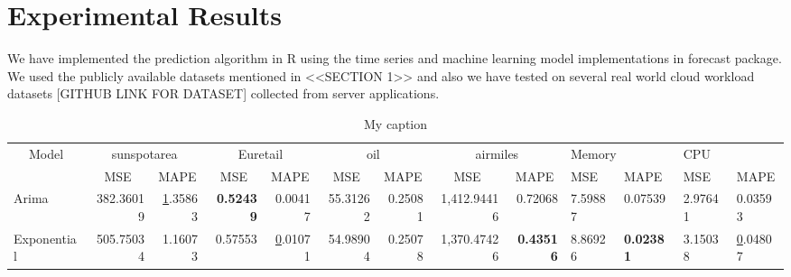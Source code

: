 \usepackage{booktabs}
\usepackage{multirow}
\usepackage[normalem]{ulem}
\useunder{\uline}{\ul}{}

\section{Experimental Results}

We have implemented the prediction algorithm in R using the time series and machine learning model implementations in forecast package. We used the publicly available datasets mentioned in <<SECTION 1>> and also we have tested on several real world cloud workload datasets [GITHUB LINK FOR DATASET] collected from server applications.

\begin{table}[]
\centering
\caption{My caption}
\label{my-label}
\begin{tabular}{@{}|l|r|r|r|r|r|r|r|r|l|l|l|l|@{}}
\toprule
\multicolumn{1}{|c|}{\multirow{2}{*}{Model}} & \multicolumn{2}{c|}{sunspotarea}                                                & \multicolumn{2}{c|}{Euretail}                                        & \multicolumn{2}{c|}{oil}                                              & \multicolumn{2}{c|}{airmiles}                                            & \multicolumn{2}{l|}{Memory}         & \multicolumn{2}{l|}{CPU}            \\ \cmidrule(l){2-13} 
\multicolumn{1}{|c|}{}                       & \multicolumn{1}{c|}{MSE}                & \multicolumn{1}{c|}{MAPE}             & \multicolumn{1}{c|}{MSE}     & \multicolumn{1}{c|}{MAPE}             & \multicolumn{1}{c|}{MSE}               & \multicolumn{1}{c|}{MAPE}    & \multicolumn{1}{c|}{MSE}                  & \multicolumn{1}{c|}{MAPE}    & MSE              & MAPE             & MSE              & MAPE             \\ \midrule
Arima                                        & 382.36019                               & {\ul 1.35863}                         & \textbf{0.52439}             & 0.00417                               & 55.31262                               & 0.25081                      & 1,412.94416                               & 0.72068                      & 7.59887          & 0.07539          & 2.97641          & 0.03593          \\ \midrule
Exponential                                  & 505.75034                               & 1.16073                               & 0.57553                      & {\ul 0.01071}                         & 54.98904                               & 0.25078                      & 1,370.47426                               & \textbf{0.43516}             & 8.86926          & \textbf{0.02381} & 3.15038          & {\ul 0.04807}    \\ \midrule

\end{tabular}
\end{table}
